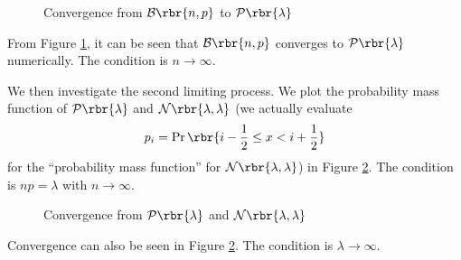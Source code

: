 \documentclass[english, nochinese]{pnote}
\DeclareMathOperator\oppr{\mathrm{Pr}}
\begin{document}
\begin{figure}[htb]
\centering
\scalebox{0.7}{}
\caption{Convergence from $ \mathcal{B} \rbr{ n, p } $ to $ \mathcal{P} \rbr{\lambda} $}
\label{Fig:BinomPoi}
\end{figure}

From Figure \ref{Fig:BinomPoi}, it can be seen that $ \mathcal{B} \rbr{ n, p } $ converges to $ \mathcal{P} \rbr{\lambda} $ numerically. The condition is $ n \rightarrow \infty $.

We then investigate the second limiting process. We plot the probability mass function of $ \mathcal{P} \rbr{\lambda} $ and $ \mathcal{N} \rbr{ \lambda, \lambda } $ (we actually evaluate
\begin{equation}
p_i = \oppr \rbr{ i - \frac{1}{2} \le x < i + \frac{1}{2} }
\end{equation}
for the ``probability mass function'' for $ \mathcal{N} \rbr{ \lambda, \lambda } $) in Figure \ref{Fig:PoiNorm}. The condition is $ n p = \lambda $ with $ n \rightarrow \infty $.

\begin{figure}[htb]
\centering
\scalebox{0.7}{}
\caption{Convergence from $ \mathcal{P} \rbr{\lambda} $ and $ \mathcal{N} \rbr{ \lambda, \lambda } $}
\label{Fig:PoiNorm}
\end{figure}

Convergence can also be seen in Figure \ref{Fig:PoiNorm}. The condition is $ \lambda \rightarrow \infty $.
\end{document}
